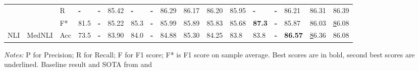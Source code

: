 \documentclass[nocrop]{bioinfo}
\begin{document}
\begin{landscape}
\begin{table}[]
\begin{tabular}{@{}lllllllllllllllllll@{}}
\multicolumn{1}{c}{}                     & \multicolumn{3}{l}{}                                                                 & R       & \textbf{-}     & \multicolumn{1}{l|}{\textbf{-}}  & 85.42 & \textbf{-} & \textbf{-}     & 86.29                                                                      & 86.17                                                               & \multicolumn{1}{l|}{86.20}                                                            & 85.95       & \textbf{-}    & \textbf{-}     & 86.21                                                                      & 86.31                                                               & 86.39                                                            \\
\multicolumn{1}{c}{}                     & \multicolumn{3}{l}{}                                                                 & F*      & 81.5           & \multicolumn{1}{l|}{\textbf{-}}  & 85.22 & 85.3       & \textbf{-}     & 85.99                                                                      & 85.89                                                               & \multicolumn{1}{l|}{85.83}                                                            & 85.68       & \textbf{87.3} & \textbf{-}     & 85.87                                                                      & 86.03                                                               & {\ul 86.08}                                                      \\ \midrule
\multicolumn{1}{c}{NLI}                  & \multicolumn{3}{l}{MedNLI}                                                           & Acc     & 73.5           & \multicolumn{1}{l|}{\textbf{-}}  & 83.90 & 84.0       & \textbf{-}     & 84.88                                                                      & 85.30                                                               & \multicolumn{1}{l|}{84.25}                                                            & 83.8        & 83.8          & \textbf{-}     & \textbf{86.57}                                                             & {\ul 86.36}                                                         & 86.08                                                            \\ \bottomrule
\end{tabular}
\label{ner}

\begin{tablenotes}
      \small
      \item \textit{Notes:} P for Precision; R for Recall; F for F1 score; F* is F1 score on sample average. Best scores are in bold, second best scores are underlined. Baseline result and SOTA from \cite{DBLP:journals/corr/abs-1901-08746} and \cite{DBLP:journals/corr/abs-1906-05474}
\end{tablenotes}

\end{table}
\end{landscape}
 





\end{document}
